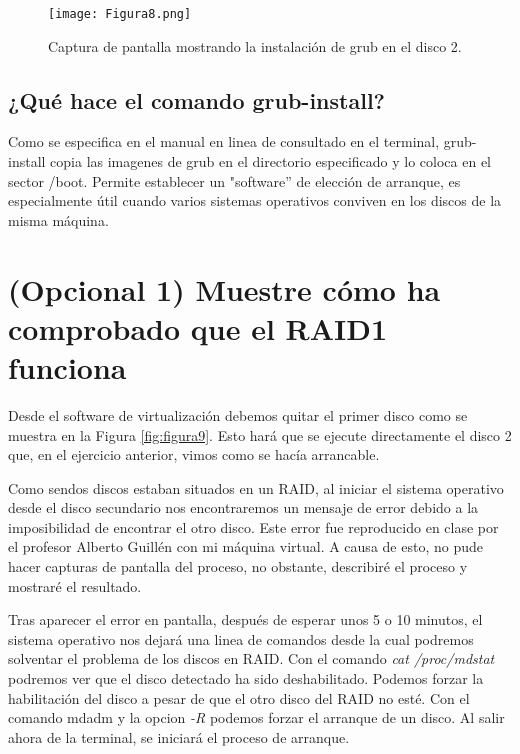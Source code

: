 \begin{figure}[H]
\centering
\texttt{[image: Figura8.png]} 
\caption{Captura de pantalla mostrando la instalación de grub en el disco 2.} \label{fig:figura8}
\end{figure}

\subsection{¿Qué hace el comando grub-install?}

Como se especifica en el manual en linea de consultado en el terminal, grub-install copia las imagenes de grub en el directorio especificado y lo coloca en el sector /boot. Permite
establecer un "software'' de elección de arranque, es especialmente útil cuando varios sistemas operativos conviven en los discos de la misma máquina.





\section{(Opcional 1) Muestre cómo ha comprobado que el RAID1 funciona}

Desde el software de virtualización debemos quitar el primer disco como se muestra en la Figura \ref{fig:figura9}. Esto hará que se ejecute directamente el disco 2 que, en el ejercicio
anterior, vimos como se hacía arrancable.

\vspace{5mm}

Como sendos discos estaban situados en un RAID, al iniciar el sistema operativo desde el disco secundario nos encontraremos un mensaje de error debido a la imposibilidad de
encontrar el otro disco. Este error fue reproducido en clase por el profesor Alberto Guillén con mi máquina virtual. A causa de esto, no pude hacer capturas de pantalla del proceso,
no obstante, describiré el proceso y mostraré el resultado.\\

\vspace{5mm}

Tras aparecer el error en pantalla, después de esperar unos 5 o 10 minutos, el sistema operativo nos dejará una linea de comandos desde la cual podremos solventar el problema
de los discos en RAID. Con el comando \textit{cat /proc/mdstat} podremos ver que el disco detectado ha sido deshabilitado. Podemos forzar la habilitación del disco a pesar de que 
el otro disco del RAID no esté. Con el comando mdadm\cite{mdadm} y la opcion \textit{-R} podemos forzar el arranque de un disco. Al salir ahora de la terminal, se iniciará el proceso
de arranque. \\

